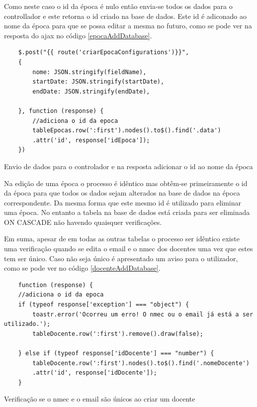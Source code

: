 \documentclass[12pt, twoside]{report}
\begin{document}
	Como neste caso o id da época é nulo então envia-se todos os dados para o controllador e este retorna o id criado na base de dados. Este id é adiconado ao nome da época para que se possa editar a mesma no futuro, como se pode ver na resposta do ajax no código \ref{epocaAddDatabase}.
	
	\begin{listing}[H]
	\begin{verbatim}
	$.post("{{ route('criarEpocaConfigurations')}}",
	{
		nome: JSON.stringify(fieldName),
		startDate: JSON.stringify(startDate),
		endDate: JSON.stringify(endDate),
			
	}, function (response) {
		//adiciona o id da epoca
		tableEpocas.row(':first').nodes().to$().find('.data')
		.attr('id', response['idEpoca']);
	})
	\end{verbatim}
	\caption{Envio de dados para o controlador e na resposta adicionar o id ao nome da época}
	\label{epocaAddDatabase}
	\end{listing}

	Na edição de uma época o processo é idêntico mas obtêm-se primeiramente o id da época para que todos os dados sejam alterados na base de dados na época correspondente. Da mesma forma que este mesmo id é utilizado para eliminar uma época. No entanto a tabela na base de dados está criada para ser eliminada ON CASCADE não havendo quaisquer verificações.
	
	Em suma, apesar de em todas as outras tabelas o processo ser idêntico existe uma verificação quando se edita o email e o nmec dos docentes uma vez que estes tem ser único. Caso não seja único é apresentado um aviso para o utilizador, como se pode ver no código \ref{docenteAddDatabase}.
	
	\begin{listing}[H]
	\begin{verbatim}
	function (response) {
	//adiciona o id da epoca
	if (typeof response['exception'] === "object") {
		toastr.error('Ocorreu um erro! O nmec ou o email já está a ser utilizado.');
		tableDocente.row(':first').remove().draw(false);
			
	} else if (typeof response['idDocente'] === "number") {
		tableDocente.row(':first').nodes().to$().find('.nomeDocente')
		.attr('id', response['idDocente']);
	}
	\end{verbatim}
	\caption{Verificação se o nmec e o email são únicos ao criar um docente}
	\label{docenteAddDatabase}
	\end{listing}
\end{document}
